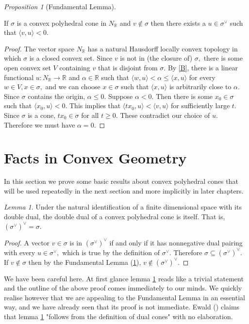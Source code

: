 \documentclass[BSc]{usydthesis}
\numberwithin{equation}{chapter}
\theoremstyle{remark}
\newtheorem{Proposition}[equation]{Proposition}
\newtheorem{Lemma}[equation]{Lemma}
\newcommand{\R}{\mathbb{R}}
\newcommand{\V}{\vee}
\begin{document}
\begin{Proposition}[Fundamental Lemma]\label{Fundamental Lemma}

If $\sigma$ is a convex polyhedral cone in $N_{\R}$ and $v\notin \sigma$ then there exists a $u\in \sigma^{\V}$ such that $ \langle v , u \rangle < 0.$ 
\end{Proposition} 

\begin{proof} The vector space $N_{\R}$ has a natural Hausdorff locally convex topology in which $\sigma$ is a closed convex set. Since $v$ is not in (the closure of) $\sigma,$ there is some open convex set $V$ containing $v$ that is disjoint from $\sigma.$ By \ref{B}, there is a linear functional $u : N_{\R}\to \R$ and $\alpha \in \R$ such that $\langle w, u \rangle < \alpha \leq \langle x , u \rangle $ for every $w\in V, x\in \sigma,$ and we can choose $x\in \sigma$ such that $\langle x, u\rangle$ is arbitrarily close to $\alpha.$ Since $\sigma$ contains the origin, $\alpha \leq 0.$ Suppose $\alpha < 0.$ Then there is some $x_0\in \sigma$ such that $\langle x_0 , u \rangle < 0.$ This implies that $ \langle tx_0, u \rangle < \langle v , u \rangle$ for sufficiently large $t.$ Since $\sigma$ is a cone, $tx_0\in \sigma$ for all $t\geq 0.$ These contradict our choice of $u.$ Therefore we must have $\alpha =0.$ 
\end{proof}  

\section{Facts in Convex Geometry}

In this section we prove some basic results about convex polyhedral cones that will be used repeatedly in the next section and more implicitly in later chapters. 

\begin{Lemma}\label{C}
Under the natural identification of a finite dimensional space with its double dual, the double dual of a convex polyhedral cone is itself. That is, $(\sigma^{\V})^{\V} = \sigma.$
\end{Lemma}

\begin{proof}
A vector $v\in \sigma$ is in $(\sigma^{\V})^{\V}$ if and only if it has nonnegative dual pairing with every $u\in \sigma^{\V},$ which is true by the definition of $\sigma^{\V}.$ Therefore $\sigma \subseteq (\sigma^{\V})^{\V}.$ If $v\notin \sigma$ then by the Fundamental Lemma (\ref{Fundamental Lemma}), $v\notin (\sigma^{\V})^{\V}.$
\end{proof}
We have been careful here. At first glance lemma \ref{C} reads like a trivial statement and the outline of the above proof comes immediately to our minds. We quickly realise however that we are appealing to the Fundamental Lemma in an essential way, and we have already seen that its proof is not immediate. Ewald (\cite[Page.~ 149, Lemma 2.2(f)]{Ewald}) claims that lemma \ref{C} "follows from the definition of dual cones" with no elaboration.
\end{document}
